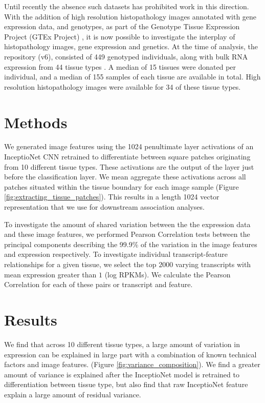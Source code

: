 \documentclass{article}
\begin{document}
Until recently the absence such datasets has prohibited work in this direction. With the addition of high resolution histopathology images annotated with gene expression data, and genotypes, as part of the Genotype Tissue Expression Project (GTEx Project) \cite{GTEx-project}, it is now possible to investigate the interplay of histopathology images, gene expression and genetics. At the time of analysis, the repository (v6), consisted of 449 genotyped individuals, along with bulk RNA expression from 44 tissue types \cite{GTEx-histology}. A median of 15 tissues were donated per individual, and a median of 155 samples of each tissue are available in total. High resolution histopathology images were available for 34 of these tissue types.

\section{Methods}

We generated image features using the 1024 penultimate layer activations of an InceptioNet CNN retrained to differentiate between square patches originating from 10 different tissue types. These activations are the output of the layer just before the classification layer. We mean aggregate these activations across all patches situated within the tissue boundary for each image sample (Figure \ref{fig:extracting_tissue_patches}). This results in a length 1024 vector representation that we use for downstream association analyses.

To investigate the amount of shared variation between the the expression data and these image features, we performed Pearson Correlation tests between the principal components describing the 99.9\% of the variation in the image features and expression respectively. To investigate individual transcript-feature relationships for a given tissue, we select the top $2000$ varying transcripts with mean expression greater than $1$ (log RPKMs). We calculate the Pearson Correlation for each of these pairs or transcript and feature.

\section{Results}
We find that across 10 different tissue types, a large amount of variation in expression can be explained in large part with a combination of known technical factors and image features. (Figure \ref{fig:variance_composition}). We find a greater amount of variance is explained after the InceptioNet model is retrained to differentiation between tissue type, but also find that raw InceptioNet feature explain a large amount of residual variance.
\end{document}
